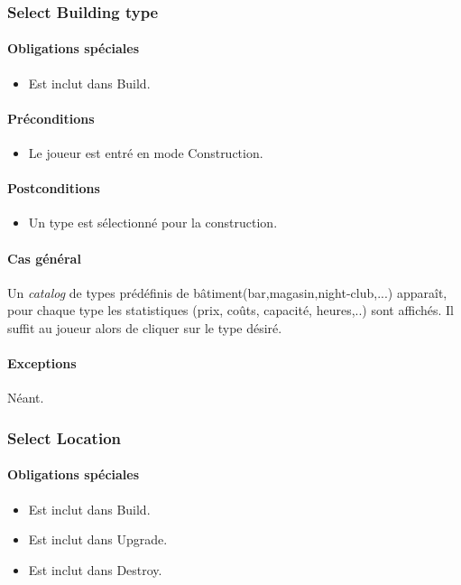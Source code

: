 \documentclass[a4paper,11pt]{report}
\begin{document}
\subsubsection{Select Building type}
\paragraph{Obligations spéciales}
\begin{itemize}
 \item Est inclut dans Build.
\end{itemize}
\paragraph{Préconditions}
\begin{itemize}
 \item Le joueur est entré en mode Construction.
\end{itemize}
\paragraph{Postconditions}
\begin{itemize}
 \item Un type est sélectionné pour la construction.
\end{itemize}
\paragraph{Cas général}
Un \textit{catalog} de types prédéfinis de bâtiment(bar,magasin,night-club,...) apparaît, pour chaque type les statistiques (prix, coûts, capacité, heures,..) sont affichés. Il suffit au joueur alors de cliquer sur le type désiré.
\paragraph{Exceptions} Néant.

\newpage
\subsubsection{Select Location}
\paragraph{Obligations spéciales}
\begin{itemize}
 \item Est inclut dans Build.
 \item Est inclut dans Upgrade.
 \item Est inclut dans Destroy.
\end{itemize}
\end{document}
